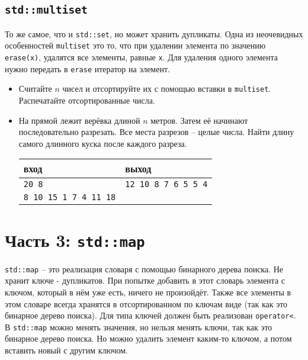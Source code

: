 \documentclass{article}
\begin{document}
\subsection*{\texttt{std::multiset}}
То же самое, что и \texttt{std::set}, но может хранить дупликаты. Одна из неочевидных особенностей \texttt{multiset} это то, что при удалении элемента по значению \texttt{erase(x)}, удалятся все элементы, равные \texttt{x}. Для удаления одного элемента нужно передать в \texttt{erase} итератор на элемент.
\begin{itemize}
\item Считайте $n$ чисел и отсортируйте их с помощью вставки в \texttt{multiset}. Распечатайте отсортированные числа.
\item На прямой лежит верёвка длиной $n$ метров. Затем её начинают последовательно разрезать. Все места разрезов -- целые числа. Найти длину самого длинного куска после каждого разреза.
\begin{center}
\begin{tabular}{ l | l }
 вход & выход \\ \hline
 \texttt{20 8} & \texttt{12 10 8 7 6 5 5 4}  \\ 
 \texttt{8 10 15 1 7 4 11 18} &  \\
\end{tabular}
\end{center}
\end{itemize}

\newpage
\section*{Часть 3: \texttt{std::map}}
\texttt{std::map} -- это реализация словаря с помощью бинарного дерева поиска. Не хранит ключе - дупликатов. При попытке добавить в этот словарь элемента с ключом, который в нём уже есть, ничего не произойдёт. Также все элементы в этом словаре всегда хранятся в отсортированном по ключам виде (так как это бинарное дерево поиска). Для типа ключей должен быть реализован \texttt{operator<}. В \texttt{std::map} можно менять значения, но нельзя менять ключи, так как это бинарное дерево поиска. Но можно удалить элемент каким-то ключом, а потом вставить новый с другим ключом.\\
\end{document}
